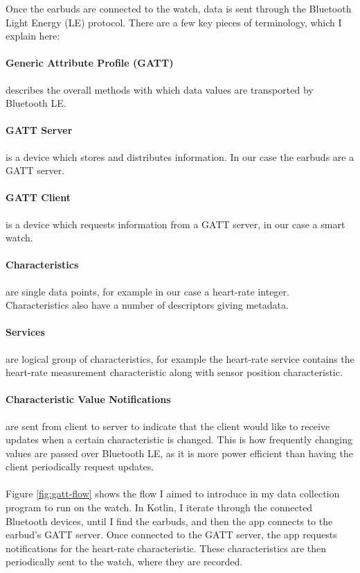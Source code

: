\documentclass[12pt,a4paper,twoside,openany]{report}
\begin{document}
Once the earbuds are connected to the watch, data is
sent through the Bluetooth Light Energy (LE) protocol. There are a few key
pieces of terminology, which I explain here:

\paragraph{Generic Attribute Profile (GATT)} describes the overall methods
with which data values are transported by Bluetooth LE.

\paragraph{GATT Server} is a device which stores and distributes information. In
our case the earbuds are a GATT server.

\paragraph{GATT Client} is a device which requests information from a GATT
server, in our case a smart watch.

\paragraph{Characteristics} are single data points, for example in our case a
heart-rate integer. Characteristics also have a number of descriptors
giving metadata.

\paragraph{Services} are logical group of characteristics, for example the
heart-rate service contains the heart-rate measurement characteristic along
with sensor position characteristic.

\paragraph{Characteristic Value Notifications} are sent from client to server
to indicate that the client would like to receive updates when a certain
characteristic is changed. This is how frequently changing values are passed
over Bluetooth LE, as it is more power efficient than having the client
periodically request updates.
\\
\\

Figure \ref{fig:gatt-flow} shows the flow I aimed to introduce in my data collection program to run
on the watch. In Kotlin, I iterate through the connected Bluetooth devices,
until I find the earbuds, and then the app connects to the earbud's GATT
server. Once connected 
to the GATT server, the app
requests notifications for the heart-rate characteristic. These
characteristics are then periodically sent to the watch, where they are
recorded.
\end{document}
